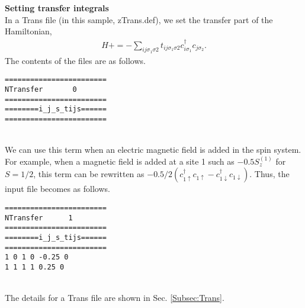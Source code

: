 \begin{description}
\item {\bf Setting transfer integrals}\\
In a Trans file (in this sample, zTrans.def), we set the transfer part of the Hamiltonian,
\begin{align}
H +=-\sum_{ij\sigma_1\sigma2} t_{ij\sigma_1\sigma2}c_{i\sigma_1}^{\dag}c_{j\sigma_2}.
\end{align}
The contents of the files are as follows.\\
\begin{minipage}{15cm}
\begin{screen}
\begin{verbatim}
======================== 
NTransfer       0  
======================== 
========i_j_s_tijs====== 
======================== 
\end{verbatim}
\end{screen}
\end{minipage}
~\\
We can use this term when an electric magnetic field is added in the spin system.
For example, when a magnetic field is added at a site 1 such as $-0.5 S_z^{(1)}$ { for $S=1/2$},
this term can be rewritten as $-0.5/2(c_{1\uparrow}^{\dag}c_{1\uparrow}-c_{1\downarrow}^{\dag}c_{1\downarrow})$.
Thus, the input file becomes as follows.\\
\begin{minipage}{15cm}
\begin{screen}
\begin{verbatim}
======================== 
NTransfer      1   
======================== 
========i_j_s_tijs====== 
======================== 
1 0 1 0 -0.25 0
1 1 1 1 0.25 0
\end{verbatim}
\end{screen}
\end{minipage}
~\\
The details for a Trans file are shown in Sec. \ref{Subsec:Trans}.


\end{description}
